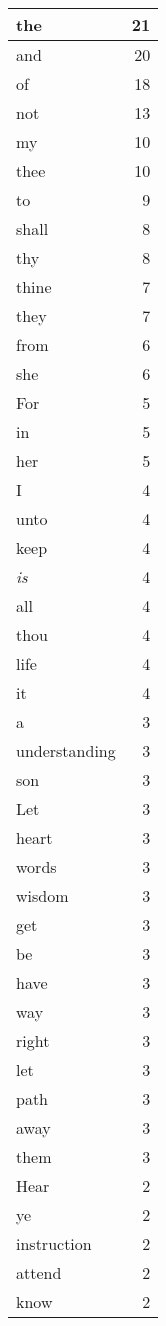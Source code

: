 \begin{center}
\begin{longtable}{l|r}
the & 21\\ \hline 
and & 20\\ \hline 
of & 18\\ \hline 
not & 13\\ \hline 
my & 10\\ \hline 
thee & 10\\ \hline 
to & 9\\ \hline 
shall & 8\\ \hline 
thy & 8\\ \hline 
thine & 7\\ \hline 
they & 7\\ \hline 
from & 6\\ \hline 
she & 6\\ \hline 
For & 5\\ \hline 
in & 5\\ \hline 
her & 5\\ \hline 
I & 4\\ \hline 
unto & 4\\ \hline 
keep & 4\\ \hline 
\emph{is} & 4\\ \hline 
all & 4\\ \hline 
thou & 4\\ \hline 
life & 4\\ \hline 
it & 4\\ \hline 
a & 3\\ \hline 
understanding & 3\\ \hline 
son & 3\\ \hline 
Let & 3\\ \hline 
heart & 3\\ \hline 
words & 3\\ \hline 
wisdom & 3\\ \hline 
get & 3\\ \hline 
be & 3\\ \hline 
have & 3\\ \hline 
way & 3\\ \hline 
right & 3\\ \hline 
let & 3\\ \hline 
path & 3\\ \hline 
away & 3\\ \hline 
them & 3\\ \hline 
Hear & 2\\ \hline 
ye & 2\\ \hline 
instruction & 2\\ \hline 
attend & 2\\ \hline 
know & 2\\ \hline 

\end{longtable}
\end{center}
